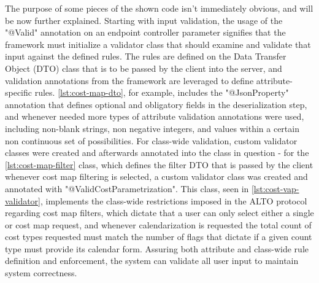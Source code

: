     The purpose of some pieces of the shown code isn't immediately obvious, and will be now further explained.
    Starting with input validation, the usage of the "@Valid" annotation on an endpoint controller parameter signifies that the framework must initialize a validator class that should examine and validate that input against the defined rules.
    The rules are defined on the Data Transfer Object (DTO) class that is to be passed by the client into the server, and validation annotations from the framework are leveraged to define attribute-specific rules.
    \ref{lst:cost-map-dto}, for example, includes the "@JsonProperty" annotation that defines optional and obligatory fields in the deserialization step, and whenever needed more types of attribute validation annotations were used, including non-blank strings, non negative integers, and values within a certain non continuous set of possibilities.
    For class-wide validation, custom validator classes were created and afterwards annotated into the class in question - for the \ref{lst:cost-map-filter} class, which defines the filter DTO that is passed by the client whenever cost map filtering is selected, a custom validator class was created and annotated with "@ValidCostParametrization".
    This class, seen in \ref{lst:cost-vap-validator}, implements the class-wide restrictions imposed in the ALTO protocol regarding cost map filters, which dictate that a user can only select either a single or cost map request, and whenever calendarization is requested the total count of cost types requested must match the number of flags that dictate if a given count type must provide its calendar form.
    Assuring both attribute and class-wide rule definition and enforcement, the system can validate all user input to maintain system correctness.

